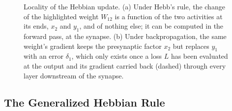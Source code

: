 \begin{figure}[htbp]
\caption[Locality of the Hebbian update]{Locality of the Hebbian update. (a) Under Hebb's rule, the change of the highlighted weight $W_{12}$ is a function of the two activities at its ends, $x_2$ and $y_1$, and of nothing else; it can be computed in the forward pass, at the synapse. (b) Under backpropagation, the same weight's gradient keeps the presynaptic factor $x_2$ but replaces $y_1$ with an error $\delta_1$, which only exists once a loss $L$ has been evaluated at the output and its gradient carried back (dashed) through every layer downstream of the synapse.}
\label{fig:hebb-locality}
\end{figure}

\subsection{The Generalized Hebbian Rule}
\label{subsec:abcd}


